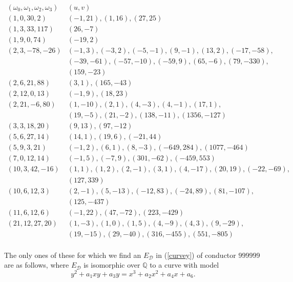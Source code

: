 $$
\begin{array}{c|c} 
(\omega_0,\omega_1,\omega_2,\omega_3) & (u,v) \\ \hline
(1, 0, 30, 2) & (-1,21), (1,16), (27,25) \\
(1,3,33,117) & (26,-7) \\
(1,9,0,74) &  (-19,2) \\
(2,3,-78,-26) & (-1,3), (-3,2), (-5,-1), (9,-1), (13,2), (-17,-58), \\
&    (-39,-61),(-57,-10), (-59,9), (65,-6), (79,-330), \\
& (159,-23) \\
(2,6,21,88) & (3,1), (165,-43) \\
(2,12,0,13) & (-1,9), (18,23) \\
(2,21,-6,80) & (1, -10), (2,1), (4, -3), (4,-1), (17, 1),\\
& 	(19, -5),(21, -2 ),(138, -11 ),(1356, -127) \\
(3,3,18,20) & (9,13), (97,-12) \\
(5,6,27,14) & (14,1),  (19,6),  (-21,44) \\
(5,9,3,21) & (-1,2), (6,1), (8,-3), (-649,284), (1077,-464)  \\
(7,0,12,14) & (-1,5), (-7,9), (301,-62), (-459,553)  \\
(10,3,42,-16) & (1,1), (1,2), (2,-1), (3,1), (4,-17), (20,19), (-22,-69), \\
& (127,339) \\
(10,6,12,3) & (2,-1), (5,-13), (-12,83), (-24,89), (81,-107), \\
&    (125,-437) \\
(11,6,12,6) & (-1,22), (47,-72), (223,-429) \\
(21,12,27,20) & (1, -3 ),(1, 0 ),(1, 5 ),(4, -9),(4, 3 ),(9, -29 ),\\
& 	(19, -15 ),(29, -40 ),(316, -455 ),(551, -805)\\
\end{array}
$$ 


The only ones of these for which we find an $E_{\mathcal{D}}$ in (\ref{curvey})  of conductor $999999$ are as follows, where $E_{\mathcal{D}}$ is isomorphic over $\mathbb{Q}$ to a curve with model
$$
y^2 + a_1 xy + a_3 y = x^3 + a_2 x^2 + a_4 x + a_6.
$$

